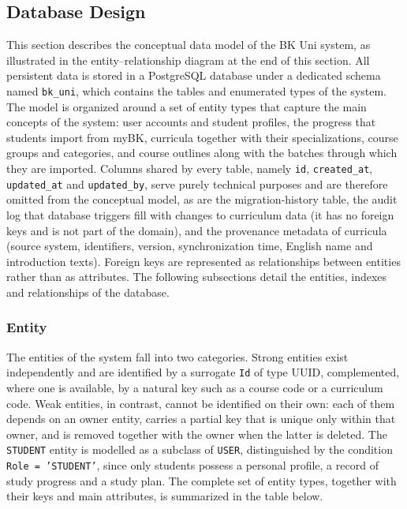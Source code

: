 \subsection{Database Design}
\label{subsec:database-design}

This section describes the conceptual data model of the BK Uni system, as illustrated in the entity--relationship diagram at the end of this section. All persistent data is stored in a PostgreSQL database under a dedicated schema named \texttt{bk\_uni}, which contains the tables and enumerated types of the system. The model is organized around a set of entity types that capture the main concepts of the system: user accounts and student profiles, the progress that students import from myBK, curricula together with their specializations, course groups and categories, and course outlines along with the batches through which they are imported. Columns shared by every table, namely \texttt{id}, \texttt{created\_at}, \texttt{updated\_at} and \texttt{updated\_by}, serve purely technical purposes and are therefore omitted from the conceptual model, as are the migration-history table, the audit log that database triggers fill with changes to curriculum data (it has no foreign keys and is not part of the domain), and the provenance metadata of curricula (source system, identifiers, version, synchronization time, English name and introduction texts). Foreign keys are represented as relationships between entities rather than as attributes. The following subsections detail the entities, indexes and relationships of the database.

\subsubsection{Entity}
\label{subsubsec:db-entity}

The entities of the system fall into two categories. Strong entities exist independently and are identified by a surrogate \texttt{Id} of type UUID, complemented, where one is available, by a natural key such as a course code or a curriculum code. Weak entities, in contrast, cannot be identified on their own: each of them depends on an owner entity, carries a partial key that is unique only within that owner, and is removed together with the owner when the latter is deleted. The \texttt{STUDENT} entity is modelled as a subclass of \texttt{USER}, distinguished by the condition \texttt{Role = 'STUDENT'}, since only students possess a personal profile, a record of study progress and a study plan. The complete set of entity types, together with their keys and main attributes, is summarized in the table below.


